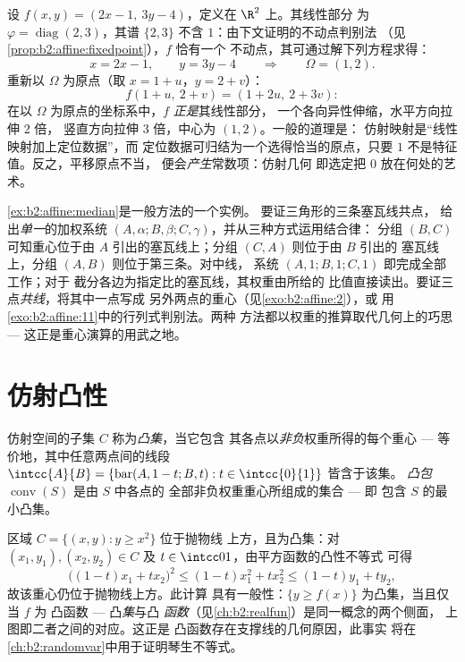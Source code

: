 \begin{example}[仿射映射的分类：从头
到尾]\label{ex:b2:affine:dilation}
设 $f(x, y) = (2x - 1,\ 3y - 4)$，定义在 $\R^2$ 上。其线性部分
为 $\varphi = \operatorname{diag}(2, 3)$，其谱
$\{2, 3\}$ 不含 $1$：由下文证明的不动点判别法
（见\cref{prop:b2:affine:fixedpoint}），$f$ 恰有一个
不动点，其可通过解下列方程求得：
\[
x = 2x - 1, \qquad y = 3y - 4
\qquad\Longrightarrow\qquad \Omega = (1, 2).
\]
重新以 $\Omega$ 为原点（取 $x = 1 + u$，$y = 2 + v$）：
\[
f(1 + u,\ 2 + v) = (1 + 2u,\ 2 + 3v) :
\]
在以 $\Omega$ 为原点的坐标系中，$f$ \emph{正是}其线性部分，
一个各向异性伸缩，水平方向拉伸 $2$ 倍，
竖直方向拉伸 $3$ 倍，中心为 $(1, 2)$。一般的道理是：
仿射映射是“线性映射加上定位数据”，而
定位数据可归结为一个选得恰当的原点，只要
$1$ 不是特征值。反之，平移原点不当，
便会\emph{产生}常数项：仿射几何
即选定把 $0$ 放在何处的艺术。
\end{example}

\begin{remark}
\cref{ex:b2:affine:median}是一般方法的一个实例。
要证三角形的三条塞瓦线共点，
给出\emph{单一}的加权系统 $(A,
\alpha; B, \beta; C, \gamma)$，并从三种方式运用结合律：
分组 $(B, C)$ 可知重心位于由
$A$ 引出的塞瓦线上；分组 $(C, A)$ 则位于由 $B$ 引出的
塞瓦线上，分组 $(A, B)$ 则位于第三条。对中线，
系统 $(A, 1; B, 1; C, 1)$ 即完成全部工作；对于
截分各边为指定比的塞瓦线，其权重由所给的
比值直接读出。要证三点\emph{共线}，将其中一点写成
另外两点的重心（见\cref{exo:b2:affine:2}），或
用\cref{exo:b2:affine:11}中的行列式判别法。两种
方法都以权重的推算取代几何上的巧思 ---
这正是重心演算的用武之地。
\end{remark}

\section{仿射凸性}

\begin{definition}\label{def:b2:affine:convex}
仿射空间的子集 $C$ 称为\emph{凸集}，当它包含
其各点以\emph{非负}权重所得的每个重心 ---
等价地，其中任意两点间的线段 $\intcc{A}{B} = \{\operatorname{bar}(A,
1-t; B, t) : t \in \intcc{0}{1}\}$ 皆含于该集。
\emph{凸包} $\operatorname{conv}(S)$ 是由 $S$ 中各点的
全部非负权重重心所组成的集合 --- 即
包含 $S$ 的最小凸集。
\end{definition}

\begin{example}[上图为
凸集]\label{ex:b2:affine:epigraph}
区域 $C = \{(x, y) : y \geq x^2\}$ 位于抛物线
上方，且为凸集：对 $(x_1, y_1), (x_2, y_2) \in C$ 及 $t \in
\intcc01$，由平方函数的凸性不等式
可得
\[
\bigl((1-t)x_1 + tx_2\bigr)^2 \leq (1-t)x_1^2 + tx_2^2
\leq (1-t)y_1 + ty_2 ,
\]
故该重心仍位于抛物线上方。此计算
具有一般性：$\{y \geq f(x)\}$ 为凸集，当且仅当 $f$ 为
凸函数 --- 凸\emph{集}与凸
\emph{函数}（见\cref{ch:b2:realfun}）是同一概念的两个侧面，
上图即二者之间的对应。这正是
凸函数存在支撑线的几何原因，此事实
将在
\cref{ch:b2:randomvar}中用于证明琴生不等式。
\end{example}

